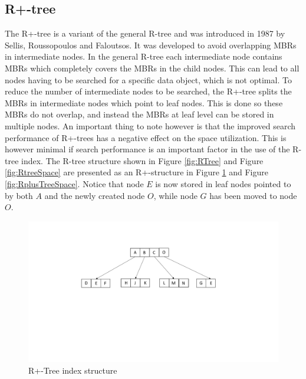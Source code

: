\subsection{R+-tree}
The R+-tree is a variant of the general R-tree and was introduced in 1987 by Sellis, Roussopoulos and Faloutsos\cite{R+Tree}. It was developed to avoid overlapping MBRs in intermediate nodes. In the general R-tree each intermediate node contains MBRs which completely covers the MBRs in the child nodes. This can lead to all nodes having to be searched for a specific data object, which is not optimal. To reduce the number of intermediate nodes to be searched, the R+-tree splits the MBRs in intermediate nodes which point to leaf nodes. This is done so these MBRs do not overlap, and instead the MBRs at leaf level can be stored in multiple nodes. An important thing to note however is that the improved search performance of R+-trees has a negative effect on the space utilization. This is however minimal if search performance is an important factor in the use of the R-tree index. The R-tree structure shown in Figure \ref{fig:RTree} and Figure \ref{fig:RtreeSpace} are presented as an R+-structure in Figure \ref{fig:RplusTree} and Figure \ref{fig:RplusTreeSpace}. Notice that node $E$ is now stored in leaf nodes pointed to by both $A$ and the newly created node $O$, while node $G$ has been moved to node $O$. 

\begin{figure}[ht]
    \centering
    \includegraphics[scale=0.4]{figures/RPlusTree.pdf}
    \caption{R+-Tree index structure}
    \label{fig:RplusTree}
\end{figure}

